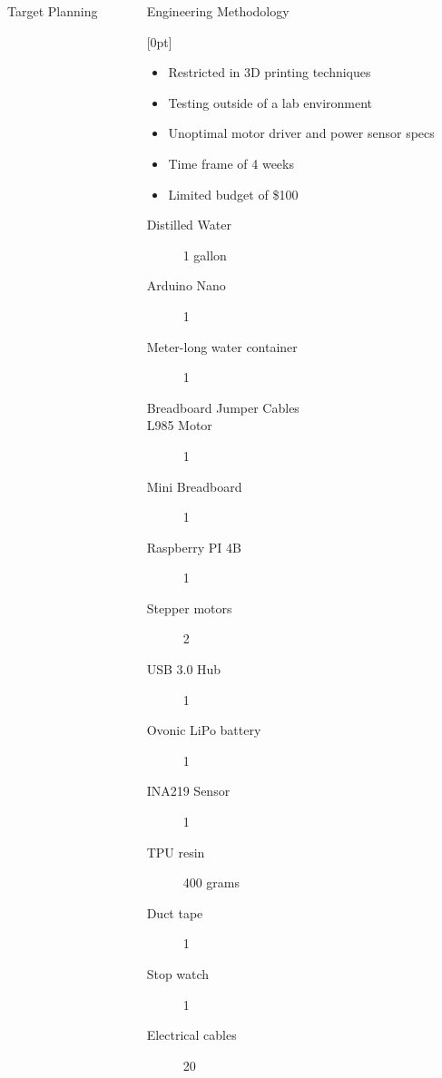 \documentclass[final, 16pt]{beamer}
\newlength{\colwidth}
\newlength{\twocolwidth}
\begin{document}
\begin{frame}[t]
\begin{columns}[t]
\begin{column}{\colwidth}
\begin{block}{Target Planning}
    \vspace{0.5cm}

  \end{block}

\end{column}

\separatorcolumn

\begin{column}{\twocolwidth}

  \begin{block}{Engineering Methodology}

    [0pt]

    \vspace{1cm}

    \begin{minipage}{0.24\linewidth}
      \begin{itemize}
        \item Restricted in 3D printing techniques
        \item Testing outside of a lab environment
        \item Unoptimal motor driver and power sensor specs
        \item Time frame of 4 weeks
        \item Limited budget of \$100
      \end{itemize}
    \end{minipage}\hfill%
    \begin{minipage}{0.72\linewidth}
      \begin{multicols}{3}
      \begin{description}
        \item[Distilled Water] 1 gallon
        \item[Arduino Nano] 1
        \item[Meter-long water container] 1
        \item[Breadboard Jumper Cables]
        \item[L985 Motor] 1 
        \item[Mini Breadboard] 1
        \item[Raspberry PI 4B] 1
        \item[Stepper motors] 2
        \item[USB 3.0 Hub] 1
        \item[Ovonic LiPo battery] 1 
        \item[INA219 Sensor] 1
        \item[TPU resin] 400 grams
        \item[Duct tape] 1
        \item[Stop watch] 1
        \item[Electrical cables] 20
      \end{description}
    \end{multicols}
    \end{minipage}


\end{block}
\end{column}
\end{columns}
\end{frame}
\end{document}
